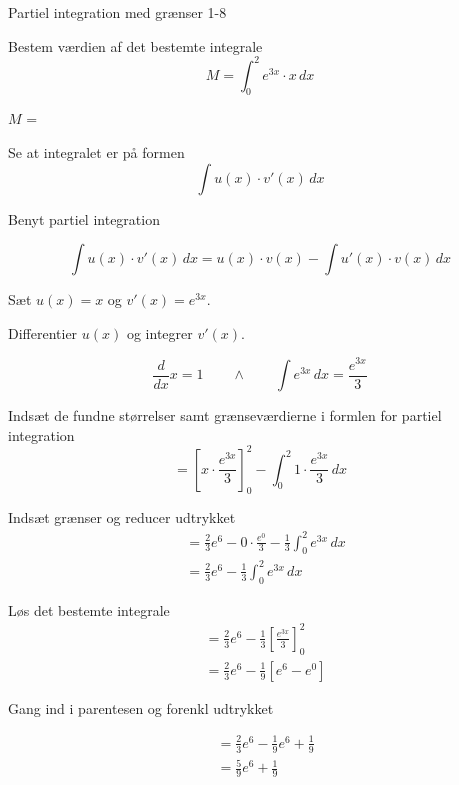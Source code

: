 \documentclass{article}
\begin{document}
\newpage

\begin{exercise}{Partiel integration med grænser 1-8}
	
	
	Bestem værdien af det bestemte integrale
	\[
	M = \int_0^2 e^{3x} \cdot x \, dx
	\]
	
	$M$ =  \\
	
	
	\hint
	
	Se at integralet er på formen
	\[
	\int u(x) \cdot v'(x) \, dx
	\]
	
	\hint
	
	Benyt partiel integration
	
	\hint
	\[
	\int u(x) \cdot v'(x)\, dx = u(x) \cdot v(x) - \int u'(x) \cdot v(x) \, dx
	\]
	\hint
	
	Sæt $u(x) = x$ og $v'(x) = e^{3x}$.
	
	
	\hint
	
	Differentier $u(x)$ og integrer $v'(x)$.
	
	\hint
	\[
	\frac{d}{dx}x = 1 \qquad \wedge \qquad \int e^{3x} \, dx = \frac{e^{3x}}{3}
	\]
	
	\hint
	
	Indsæt de fundne størrelser samt grænseværdierne i formlen for partiel integration 
	\[
	= \left[x \cdot \frac{e^{3x}}{3}\right]_{0}^{2} - \int_{0}^{2} 1 \cdot \frac{e^{3x}}{3} \, dx
	\]
	
	\hint
	
	Indsæt grænser og reducer udtrykket
	\begin{align*}
	&= \frac{2}{3} e^6 - 0 \cdot \frac{e^0}{3}  -  \frac{1}{3} \int_{0}^{2} e^{3x} \, dx \\
	&= \frac{2}{3} e^6 - \frac{1}{3} \int_{0}^{2} e^{3x} \, dx 
	\end{align*}
	
	\hint
	Løs det bestemte integrale
	\begin{align*}
	&= \frac{2}{3} e^6 - \frac{1}{3} \left[\frac{e^{3x}}{3} \right]_0^2  \\
	&= \frac{2}{3} e^6 - \frac{1}{9} \left[e^{6}-e^0\right] 
	\end{align*}
	
	\hint
	Gang ind i parentesen og forenkl udtrykket
	
	\hint
	\begin{align*}
	&= \frac{2}{3} e^6 - \frac{1}{9} e^{6} + \frac{1}{9} \\
	&= \frac{5}{9} e^6 + \frac{1}{9}
	\end{align*}
	
	
	
\end{exercise}
\end{document}
